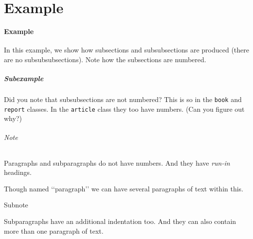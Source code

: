 \documentclass[fadttsterUserGuide_master]{subfiles}
\begin{document}
	\newpage
	\part{Example}
	\subsection{Example}
	In this example, we show how subsections and subsubsections
	are produced (there are no subsubsubsections). Note how the
	subsections are numbered.
	
	\subsubsection{Subexample}
	Did you note that subsubsections are not numbered? This is so in the
	\texttt{book} and \texttt{report} classes. In the \texttt{article}
	class they too have numbers. (Can you figure out why?)
	
	\paragraph{Note}
	Paragraphs and subparagraphs do not have numbers. And they have
	\textit{run-in} headings.
	
	Though named ‘‘paragraph’’ we can have several paragraphs of text
	within this.
	
	\subparagraph{Subnote}
	Subparagraphs have an additional indentation too.
	And they can also contain more than one paragraph of text.
	
\end{document}
